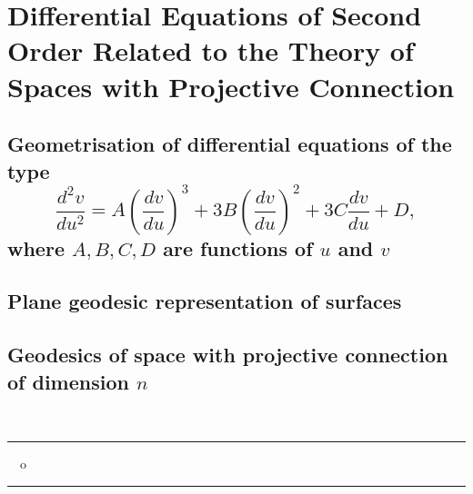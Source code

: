 
\chapter{Differential Equations of Second Order Related to the Theory of Spaces with Projective Connection}


\section{Geometrisation of differential equations of the type
$$\frac{d^2 v}{du^2} = A \left( \frac{d v}{du} \right)^3 + 3 B \left( \frac{d v}{du} \right)^2 + 3 C \frac{d v}{du} + D, $$
where $A,B,C,D$ are functions of $u$ and $v$}
             
%
%
%
%


\section{Plane geodesic representation of surfaces}

%
%
%
%
%
%


\section{Geodesics of space with projective connection of dimension $n$}

%
%

\ \\[.5cm]
\begin{center}
\rule{2cm}{.03cm} \ \ o \ \ \rule{2cm}{.03cm} 
\end{center} 


%





























